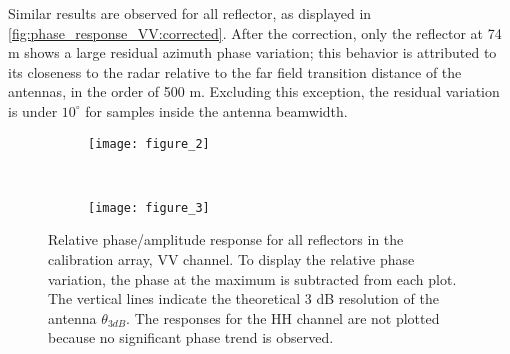 Similar results are observed for all reflector, as displayed in \autoref{fig:phase_response_VV:corrected}.  After the correction, only the reflector at 74 m shows a large residual azimuth phase variation; this behavior is attributed to its closeness to the radar relative to the far field transition distance of the antennas, in the order of 500 m. Excluding this exception, the residual variation is under $10^\circ$ for samples inside the antenna beamwidth.
\begin{figure*}[ht]
	\centering
	\begin{subfigure}[t]{\textwidth}
		\centering
		\texttt{[image: figure\_2]}
		\label{fig:phase_response_VV:uncorrected}
	\end{subfigure}\\
	\begin{subfigure}[t]{\textwidth}
		\centering
		\texttt{[image: figure\_3]}
		\label{fig:phase_response_VV:corrected}
	\end{subfigure}
	\caption{Relative phase/amplitude response for all reflectors in the calibration array, VV channel. To display the relative phase variation, the phase at the maximum is subtracted from each plot. The vertical lines indicate the theoretical 3 dB resolution of the antenna $\theta_{3dB}$. The responses for the HH channel are not plotted because no significant phase trend is observed.}
	\label{fig:phase_response_VV}
\end{figure*}

